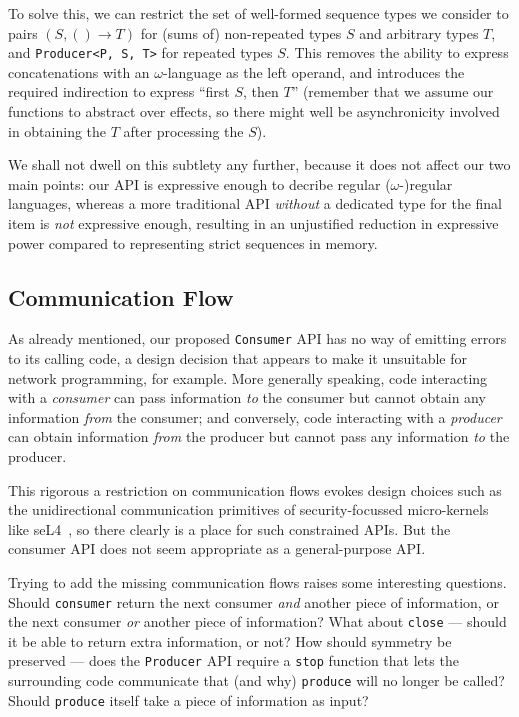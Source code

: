 \documentclass[sigplan,screen,10pt,anonymous,review]{acmart}
\begin{document}
To solve this, we can restrict the set of well-formed sequence types we consider to pairs $(S, () \rightarrow T)$ for (sums of) non-repeated types $S$ and arbitrary types $T$, and \texttt{Producer<P, S, T>} for repeated types $S$. This removes the ability to express concatenations with an $\omega$-language as the left operand, and introduces the required indirection to express ``first $S$, then $T$'' (remember that we assume our functions to abstract over effects, so there might well be asynchronicity involved in obtaining the $T$ after processing the $S$).

We shall not dwell on this subtlety any further, because it does not affect our two main points: our API is expressive enough to decribe regular ($\omega$-)regular languages, whereas a more traditional API \textit{without} a dedicated type for the final item is \textit{not} expressive enough, resulting in an unjustified reduction in expressive power compared to representing strict sequences in memory.

\subsection{Communication Flow}\label{communication_flow}

As already mentioned, our proposed \texttt{Consumer} API has no way of emitting errors to its calling code, a design decision that appears to make it unsuitable for network programming, for example. More generally speaking, code interacting with a \textit{consumer} can pass information \textit{to} the consumer but cannot obtain any information \textit{from} the consumer; and conversely, code interacting with a \textit{producer} can obtain information \textit{from} the producer but cannot pass any information \textit{to} the producer.

This rigorous a restriction on communication flows evokes design choices such as the unidirectional communication primitives of security-focussed micro-kernels like seL4~\cite{murray2013sel4}, so there clearly is a place for such constrained APIs. But the consumer API does not seem appropriate as a general-purpose API.

Trying to add the missing communication flows raises some interesting questions. Should \texttt{consumer} return the next consumer \textit{and} another piece of information, or the next consumer \textit{or} another piece of information? What about \texttt{close} --- should it be able to return extra information, or not? How should symmetry be preserved --- does the \texttt{Producer} API require a \texttt{stop} function that lets the surrounding code communicate that (and why) \texttt{produce} will no longer be called? Should \texttt{produce} itself take a piece of information as input?
\end{document}
